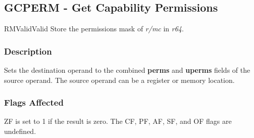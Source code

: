 \clearpage
{}
{}
\subsection*{GCPERM - Get Capability Permissions}

\begin{x86opcodetable}
  {RM}{Valid}{Valid}
  {Store the permissions mask of \emph{r/mc} in \emph{r64}.}
\end{x86opcodetable}

\begin{x86opentable}
\end{x86opentable}

\subsubsection*{Description}

Sets the destination operand to the combined \textbf{perms} and
\textbf{uperms} fields of the source operand.  The source operand can
be a register or memory location.

\subsubsection*{Flags Affected}

ZF is set to 1 if the result is zero.  The CF, PF, AF, SF, and OF
flags are undefined.
